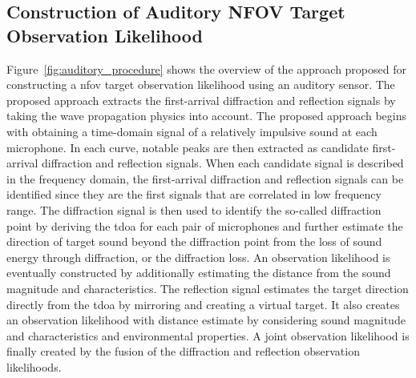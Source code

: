 \documentclass[letterpaper, 10 pt, conference]{ieeeconf}  %
\begin{document}
\subsection{Construction of Auditory NFOV Target Observation Likelihood}
Figure~\ref{fig:auditory_procedure} shows the overview of the approach proposed for constructing a \gls{nfov} target observation likelihood using an auditory sensor. The proposed approach extracts the first-arrival diffraction and reflection signals by taking the wave propagation physics into account. The proposed approach begins with obtaining a time-domain signal of a relatively impulsive sound at each microphone. In each curve, notable peaks are then extracted as candidate first-arrival diffraction and reflection signals. When each candidate signal is described in the frequency domain, the first-arrival diffraction and reflection signals can be identified since they are the first signals that are correlated in low frequency range. The diffraction signal is then used to identify the so-called diffraction point by deriving the \gls{tdoa} for each pair of microphones and further estimate the direction of target sound beyond the diffraction point from the loss of sound energy through diffraction, or the diffraction loss. An observation likelihood is eventually constructed by additionally estimating the distance from the sound magnitude and characteristics. The reflection signal estimates the target direction directly from the \gls{tdoa} by mirroring and creating a virtual target.  It also creates an observation likelihood with distance estimate by considering sound magnitude and characteristics and environmental properties. A joint observation likelihood is finally created by the fusion of the diffraction and reflection observation likelihoods.  
\end{document}
